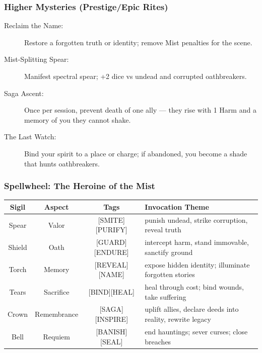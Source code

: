 \documentclass[11pt]{article}
\begin{document}
\subsubsection{Higher Mysteries (Prestige/Epic Rites)}
\begin{description}
    \item[Reclaim the Name:] Restore a forgotten truth or identity; remove Mist penalties for the scene.
    \item[Mist-Splitting Spear:] Manifest spectral spear; +2 dice vs undead and corrupted oathbreakers.
    \item[Saga Ascent:] Once per session, prevent death of one ally --- they rise with 1 Harm and a memory of you they cannot shake.
    \item[The Last Watch:] Bind your spirit to a place or charge; if abandoned, you become a shade that hunts oathbreakers.
\end{description}

\subsubsection{Spellwheel: The Heroine of the Mist}
\label{spellwheel:mist_heroine}

\begin{center}
\begin{longtable}{|c|c|c|p{6cm}|}
\hline
\textbf{Sigil} & \textbf{Aspect} & \textbf{Tags} & \textbf{Invocation Theme} \\
\hline
Spear & Valor & [SMITE][PURIFY] & punish undead, strike corruption, reveal truth \\
\hline
Shield & Oath & [GUARD][ENDURE] & intercept harm, stand immovable, sanctify ground \\
\hline
Torch & Memory & [REVEAL][NAME] & expose hidden identity; illuminate forgotten stories \\
\hline
Tears & Sacrifice & [BIND][HEAL] & heal through cost; bind wounds, take suffering \\
\hline
Crown & Remembrance & [SAGA][INSPIRE] & uplift allies, declare deeds into reality, rewrite legacy \\
\hline
Bell & Requiem & [BANISH][SEAL] & end hauntings; sever curses; close breaches \\
\hline
\end{longtable}
\end{center}
\end{document}
